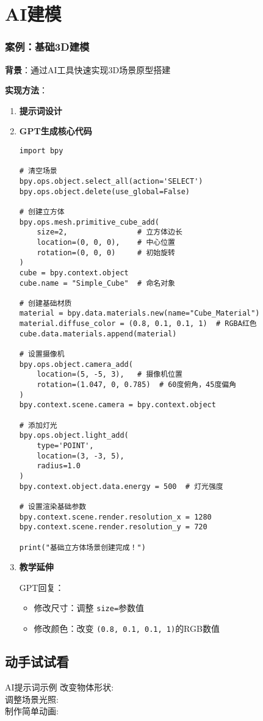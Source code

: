 \hypertarget{AIux5efaux6a21}{\section{AI建模}} \subsubsection{案例：基础3D建模}\label{ux6848ux4f8b2ux5386ux53f2ux8fdbux7a0bux6d41ux7a0bux56fe}

\textbf{背景}：通过AI工具快速实现3D场景原型搭建

\textbf{实现方法}： \begin{enumerate} \def\labelenumi{\arabic{enumi}.} \item \textbf{提示词设计} 

\item \textbf{GPT生成核心代码} 
\begin{gptbox} 
\small{ 
\begin{lstlisting}
import bpy

# 清空场景
bpy.ops.object.select_all(action='SELECT')
bpy.ops.object.delete(use_global=False)

# 创建立方体
bpy.ops.mesh.primitive_cube_add(
    size=2,                # 立方体边长
    location=(0, 0, 0),    # 中心位置
    rotation=(0, 0, 0)     # 初始旋转
)
cube = bpy.context.object
cube.name = "Simple_Cube"  # 命名对象

# 创建基础材质
material = bpy.data.materials.new(name="Cube_Material")
material.diffuse_color = (0.8, 0.1, 0.1, 1)  # RGBA红色
cube.data.materials.append(material)

# 设置摄像机
bpy.ops.object.camera_add(
    location=(5, -5, 3),   # 摄像机位置
    rotation=(1.047, 0, 0.785)  # 60度俯角，45度偏角
)
bpy.context.scene.camera = bpy.context.object

# 添加灯光
bpy.ops.object.light_add(
    type='POINT',
    location=(3, -3, 5),
    radius=1.0
)
bpy.context.object.data.energy = 500  # 灯光强度

# 设置渲染基础参数
bpy.context.scene.render.resolution_x = 1280
bpy.context.scene.render.resolution_y = 720

print("基础立方体场景创建完成！")

\end{lstlisting}
} 
\end{gptbox}

\item \textbf{教学延伸} 

GPT回复： 
\begin{gptbox} 
\small{ 
\begin{itemize} 
\item 
修改尺寸：调整
\verb|size=|参数值 
\item 修改颜色：改变
\verb|(0.8, 0.1, 0.1, 1)|的RGB数值 
\end{itemize} } 
\end{gptbox} 
\end{enumerate}

\hypertarget{ux5b9eux8df5ux6a21ux5757}{\subsection{动手试试看}} 
AI提示词示例 
改变物体形状:
\\
调整场景光照:
 \\
制作简单动画:
 \\